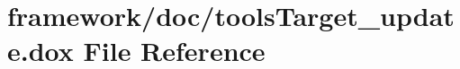 \hypertarget{tools_target__update_8dox}{}\section{framework/doc/tools\+Target\+\_\+update.dox File Reference}
\label{tools_target__update_8dox}
